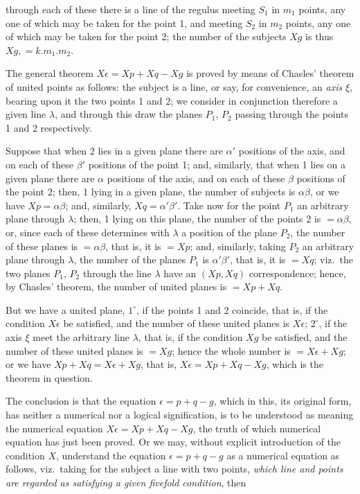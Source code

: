 \documentclass[11pt,a4paper,english]{article}
\theoremstyle{plain}
\begin{document}
\newpage
\noindent through each of these there is a line of the regulus meeting $S_1$ in $m_1$ points, any one of which may be taken for the point 1, and meeting $S_2$ in $m_2$ points, any one of which may be taken for the point 2; the number of the subjects $Xg$ is thus $Xg, = k.m_1.m_2$.

The general theorem $X\epsilon = Xp + Xq - Xg$ is proved by means of Chasles' theorem of united points as follows: the subject is a line, or say, for convenience, an \textit{axis} $\xi$, bearing upon it the two points 1 and 2; we consider in conjunction therefore a given line $\lambda$, and through this draw the planes $P_1$, $P_2$ passing through the points 1 and 2 respectively.

Suppose that when 2 lies in a given plane there are $\alpha'$ positions of the axis, and on each of these $\beta'$ positions of the point 1; and, similarly, that when 1 lies on a given plane there are $\alpha$ positions of the axis, and on each of these $\beta$ positions of the point 2; then, 1 lying in a given plane, the number of subjects is $\alpha\beta$, or we have $Xp = \alpha\beta$; and, similarly, $Xq = \alpha'\beta'$. Take now for the point $P_1$ an arbitrary plane through $\lambda$; then, 1 lying on this plane, the number of the points 2 is $= \alpha\beta$, or, since each of these determines with $\lambda$ a position of the plane $P_2$, the number of these planes is $= \alpha\beta$, that is, it is $= Xp$; and, similarly, taking $P_2$ an arbitrary plane through $\lambda$, the number of the planes $P_1$ is $\alpha'\beta'$, that is, it is $= Xq$; viz.\ the two planes $P_1$, $P_2$ through the line $\lambda$ have an $(Xp, Xq)$ correspondence; hence, by Chasles' theorem, the number of united planes is $= Xp + Xq$.

But we have a united plane, $1^{\circ}$, if the points 1 and 2 coincide, that is, if the condition $X\epsilon$ be satisfied, and the number of these united planes is $X\epsilon$; $2^{\circ}$, if the axis $\xi$ meet the arbitrary line $\lambda$, that is, if the condition $Xg$ be satisfied, and the number of these united planes is $= Xg$; hence the whole number is $= X\epsilon + Xg$; or we have $Xp + Xq = X\epsilon + Xg$, that is, $X\epsilon = Xp + Xq - Xg$, which is the theorem in question.

The conclusion is that the equation $\epsilon = p + q - g$, which in this, its original form, has neither a numerical nor a logical signification, is to be understood as meaning the numerical equation $X\epsilon = Xp + Xq - Xg$, the truth of which numerical equation has just been proved. Or we may, without explicit introduction of the condition $X$, understand the equation $\epsilon = p + q - g$ as a numerical equation as follows, viz.\ taking for the subject a line with two points, \textit{which line and points are regarded as satisfying a given fivefold condition}, then
\end{document}
